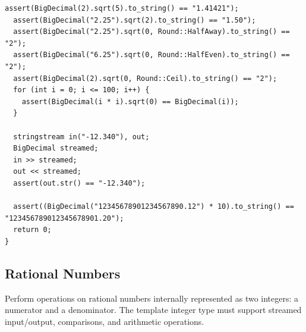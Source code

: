 \begin{lstlisting}[style=cpp]
  assert(BigDecimal(2).sqrt(5).to_string() == "1.41421");
  assert(BigDecimal("2.25").sqrt(2).to_string() == "1.50");
  assert(BigDecimal("2.25").sqrt(0, Round::HalfAway).to_string() == "2");
  assert(BigDecimal("6.25").sqrt(0, Round::HalfEven).to_string() == "2");
  assert(BigDecimal(2).sqrt(0, Round::Ceil).to_string() == "2");
  for (int i = 0; i <= 100; i++) {
    assert(BigDecimal(i * i).sqrt(0) == BigDecimal(i));
  }

  stringstream in("-12.340"), out;
  BigDecimal streamed;
  in >> streamed;
  out << streamed;
  assert(out.str() == "-12.340");

  assert((BigDecimal("12345678901234567890.12") * 10).to_string() == "123456789012345678901.20");
  return 0;
}
\end{lstlisting}
\subsection{Rational Numbers}
\label{sec:6.4.4}
Perform operations on rational numbers internally represented as two integers: a numerator and a denominator. The template integer type must support streamed input/output, comparisons, and arithmetic operations.

